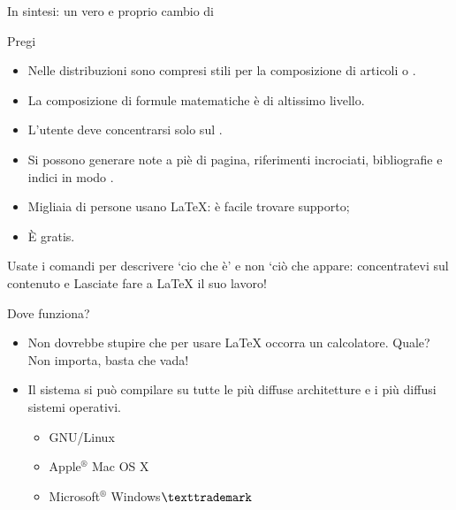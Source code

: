 \documentclass{beamer}
\begin{document}
\begin{frame}[fragile]{In sintesi: un vero e proprio cambio di }

\begin{block}{Pregi}
\begin{itemize}
	\item Nelle distribuzioni sono compresi stili per la composizione di articoli o .
	\item La composizione di \alert{formule matematiche} \`e di altissimo livello.
	\item L'utente deve concentrarsi solo sul .
	\item Si possono generare note a pi\`e di pagina, riferimenti incrociati,
	bibliografie e indici in modo .
	\item Migliaia di persone usano \LaTeX: è facile trovare supporto;
	\item \`E gratis.
\end{itemize}
\end{block}

\begin{alertblock}
{Usate i comandi per descrivere `cio che \`e' e non `ci\`o che appare: concentratevi sul contenuto e Lasciate fare a \LaTeX{} il suo lavoro!}
\end{alertblock}
\end{frame}



\begin{frame}{Dove funziona?}

\begin{itemize}
\item Non dovrebbe stupire che per usare \LaTeX{} occorra un calcolatore.
Quale? Non importa, basta che vada!
\item Il sistema si pu\`o compilare su tutte le pi\`u diffuse architetture e
i pi\`u diffusi sistemi operativi.
\begin{itemize}
\item GNU/Linux
\item Apple$^{\circledR}$ Mac OS X
\item Microsoft$^{\circledR}$ Windows${{\texttrademark}}$
\end{itemize}

\end{itemize}


\end{frame}
\end{document}
